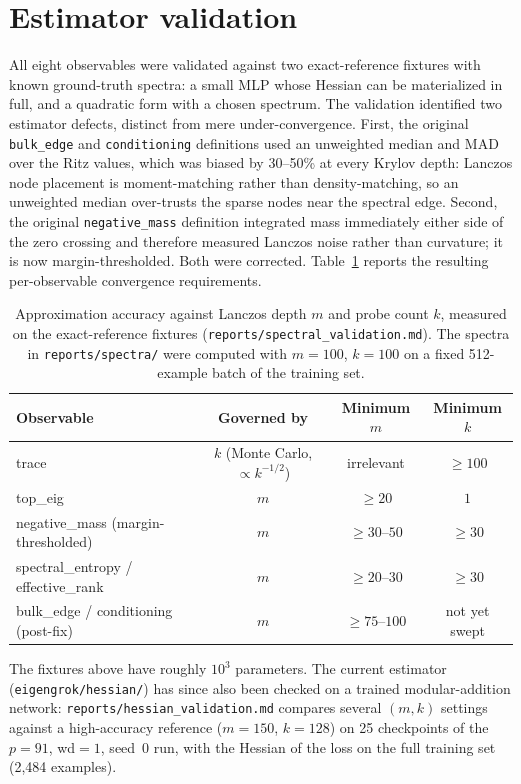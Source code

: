 \documentclass[11pt,a4paper]{article}
\begin{document}
\section{Estimator validation}
\label{sec:hess-validation}

All eight observables were validated against two exact-reference fixtures with
known ground-truth spectra: a small MLP whose Hessian can be materialized in full, and a quadratic form with a chosen spectrum. The validation identified two estimator
defects, distinct from mere under-convergence. First, the original
\texttt{bulk\_edge} and \texttt{conditioning} definitions used an unweighted
median and MAD over the Ritz values, which was biased by 30--50\% at every
Krylov depth: Lanczos node placement is moment-matching rather than
density-matching, so an unweighted median over-trusts the sparse nodes near the
spectral edge. Second, the original \texttt{negative\_mass} definition
integrated mass immediately either side of the zero crossing and therefore
measured Lanczos noise rather than curvature; it is now margin-thresholded. Both
were corrected. Table~\ref{tab:hess-mk} reports the resulting
per-observable convergence requirements.

\begin{table}[htbp]
\centering
\small
\begin{tabular}{lccc}
\toprule
Observable & Governed by & Minimum $m$ & Minimum $k$ \\
\midrule
trace & $k$ (Monte Carlo, $\propto k^{-1/2}$) & irrelevant & $\ge 100$ \\
top\_eig & $m$ & $\ge 20$ & $1$ \\
negative\_mass (margin-thresholded) & $m$ & $\ge 30$--$50$ & $\ge 30$ \\
spectral\_entropy / effective\_rank & $m$ & $\ge 20$--$30$ & $\ge 30$ \\
bulk\_edge / conditioning (post-fix) & $m$ & $\ge 75$--$100$ & not yet swept \\
\bottomrule
\end{tabular}
\caption{Approximation accuracy against Lanczos depth $m$ and probe count $k$,
measured on the exact-reference fixtures
(\texttt{reports/spectral\_validation.md}). The spectra in
\texttt{reports/spectra/} were computed with $m=100$, $k=100$ on a fixed
512-example batch of the training set.}
\label{tab:hess-mk}
\end{table}

The fixtures above have roughly $10^3$ parameters. The current estimator
(\texttt{eigengrok/hessian/}) has since also been checked on a trained
modular-addition network: \texttt{reports/hessian\_validation.md} compares
several $(m, k)$ settings against a high-accuracy reference ($m=150$, $k=128$)
on 25 checkpoints of the $p=91$, wd$=1$, seed~0 run, with the Hessian of the loss
on the full training set (2{,}484 examples).
\end{document}

